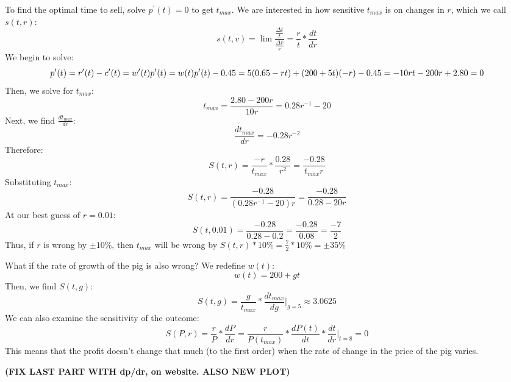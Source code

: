 \documentclass{article}
\begin{document}
To find the optimal time to sell, solve \(p^{\prime} (t)=0\) to get \(t_{max}\). 
We are interested in how sensitive \(t_{max}\) is on changes in \(r\), which
we call \(s(t,r)\):
\[
    s(t,v)=\lim{\frac{\frac{\Delta t}{t}}{\frac{\Delta r}{r}}}=\frac{r}{t}*\frac{dt}{dr}
\]
We begin to solve:
\[
    p^{\prime} (t)=r^{\prime} (t)-c^{\prime} (t) \\
    =w^{\prime} (t)p^{\prime} (t)=w(t)p^{\prime} (t)-0.45 \\
    =5(0.65-rt)+(200+5t)(-r)-0.45 \\
    =-10rt-200r+2.80=0
\]
Then, we solve for \(t_{max}\):
\[
    t_{max}=\frac{2.80-200r}{10r}=0.28r^{-1}-20
\] 
Next, we find \(\frac{dt_{max}}{dr}\):
\[
    \frac{dt_{max}}{dr}=-0.28r^{-2}
\] 
Therefore:
\[
    S(t,r)=\frac{-r}{t_{max}}*\frac{0.28}{r^2}=\frac{-0.28}{t_{max}r}
\]
Substituting \(t_{max}\):
\[
    S(t,r)=\frac{-0.28}{(0.28r^{-1}-20)r}=\frac{-0.28}{0.28-20r}
\] 
At our best guess of \(r=0.01\):
\[
    S(t,0.01)=\frac{-0.28}{0.28-0.2}=\frac{-0.28}{0.08}=\frac{-7}{2}
\] 
Thus, if \(r\) is wrong by \(\pm10\%\), then \(t_{max}\) will be wrong by \(S(t,r)*10\%=\frac{7}{2}*10\%=\pm35\%\) 

What if the rate of growth of the pig is also wrong? We redefine \(w(t)\):
\[
    w(t)=200+gt
\] 
Then, we find \(S(t,g)\):
\[
    S(t,g)=\frac{g}{t_{max}}*\frac{dt_{max}}{dg}|_{g=5}\approx3.0625
\] 
We can also examine the sensitivity of the outcome:
\[
    S(P,r)=\frac{r}{P}*\frac{dP}{dr}=\frac{r}{P(t_{max})}*\frac{dP(t)}{dt}*\frac{dt}{dr}|_{t=8}=0
\]
This means that the profit doesn't change that much (to the first order) when the rate of change in the price of the pig varies.

\textbf{(FIX LAST PART WITH dp/dr, on website. ALSO NEW PLOT)}
\end{document}
